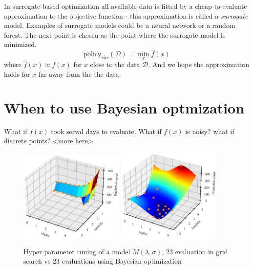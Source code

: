 \begin{testexample}
    In surrogate-based optimization all available data is fitted by a cheap-to-evaluate approximation
    to the objective function - this approximation is called a \textit{surrogate} model. Examples
    of surrogate models could be a neural network or a random forest. The next point is 
    chosen as the point where the surrogate model is minimized. 
    $$\text{policy}_{sur}(\mathcal{D}) = \min_x \hat f(x)$$
    where $\hat f(x) \approx f(x)$ for $x$ close to the data $\mathcal{D}$. And we hope the approximation
    holds for $x$ far away from the the data. 
\end{testexample}

\section{When to use Bayesian optmization}
What if $f(x)$ took serval days to evaluate. What if $f(x)$ is noisy? what if discrete points? 
<more here>


\begin{figure}[H]%
    \centering
    {\includegraphics[width=0.46\textwidth]{Pictures/BO_vs_Grid2.eps} }%
    \qquad
   {\includegraphics[width=0.46\textwidth]{Pictures/BO_vs_Grid1.eps} }%
    \caption{Hyper parameter tuning of a model $M(\lambda, \sigma)$, 
    23 evaluation in grid search vs 23 evaluations using Bayesian optimization}%
    \label{fig:example}%
\end{figure}



